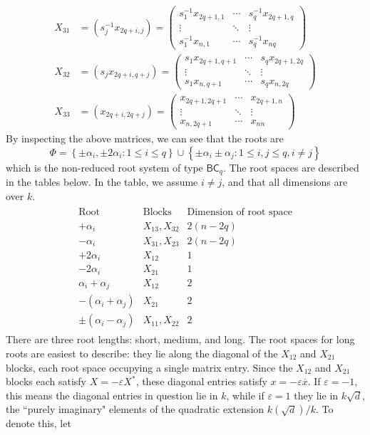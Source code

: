 \documentclass[12pt]{article}
\theoremstyle{definition}
\newcommand{\eps}{\varepsilon}
\newcommand{\lp}{\left(}
\newcommand{\rp}{\right)}
\newcommand{\lb}{\left\{}
\newcommand{\rb}{\right\}}
\newcommand{\inv}{^{-1}}
\newcommand{\ov}{\overline}
\begin{document}
\begin{align*}
	X_{31} &= \lp s_j \inv x_{2q+i, j} \rp = 
	\begin{pmatrix}
		s_1 \inv x_{2q+1, 1} & \cdots & s_q \inv x_{2q+1, q} \\
		\vdots & \ddots & \vdots \\
		s_1 \inv x_{n, 1} & \cdots & s_q \inv x_{nq}
	\end{pmatrix} \\
	X_{32} &= \lp s_j x_{2q+i, q+j} \rp = 
	\begin{pmatrix}
		s_1 x_{2q+1, q+1} & \cdots & s_q x_{2q+1, 2q} \\
		\vdots & \ddots & \vdots \\
		s_1 x_{n,q+1} & \cdots & s_q x_{n, 2q}
	\end{pmatrix} \\
	X_{33} &=\lp x_{2q+i, 2q+j} \rp = 
	\begin{pmatrix}
		x_{2q+1, 2q+1} & \cdots & x_{2q+1, n}\\
		\vdots & \ddots & \vdots \\
		x_{n, 2q+1} & \cdots & x_{nn}
	\end{pmatrix}
\end{align*}
By inspecting the above matrices, we can see that the roots are
\[
	\Phi = \lb \pm \alpha_i, \pm 2 \alpha_i : 1 \le i \le q \rb \cup \lb \pm \alpha_i \pm \alpha_j : 1 \le i, j \le q, i \neq j \rb
\]
which is the non-reduced root system of type $\mathsf{BC}_q$. The root spaces are described in the tables below. In the table, we assume $i \neq j$, and that all dimensions are over $k$.
\begin{align*}
	\begin{array}{c|c|c}
		\text{Root} & \text{Blocks} & \text{Dimension of root space}  \\
		\hline
		+\alpha_i &  X_{13}, X_{32} & 2(n-2q)  \\
		- \alpha_i & X_{31}, X_{23} & 2(n-2q) \\
		+2\alpha_i & X_{12} & 1 \\
		-2 \alpha_i & X_{21} & 1 \\
		\alpha_i + \alpha_j & X_{12} & 2 \\
		-(\alpha_i + \alpha_j) & X_{21} & 2 \\
		\pm (\alpha_i - \alpha_j) & X_{11}, X_{22} & 2
	\end{array}
\end{align*}
There are three root lengths: short, medium, and long. The root spaces for long roots are easiest to describe: they lie along the diagonal of the $X_{12}$ and $X_{21}$ blocks, each root space occupying a single matrix entry. Since the $X_{12}$ and $X_{21}$ blocks each satisfy $X = - \eps X^*$, these diagonal entries satisfy $x = - \eps \ov x$. If $\eps = -1$, this means the diagonal entries in question lie in $k$, while if $\eps = 1$ they lie in $k \sqrt{d}$, the ``purely imaginary" elements of the quadratic extension $k(\sqrt{d})/k$. To denote this, let
\end{document}

